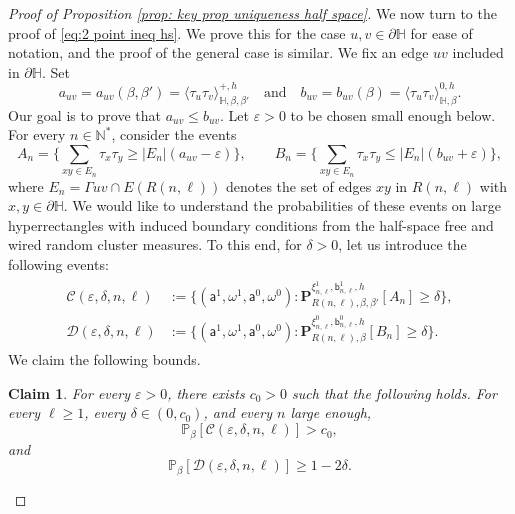 \documentclass[11pt,a4paper]{article}
\numberwithin{equation}{section}
\theoremstyle{plain}
\newtheorem{Claim}[Thm]{Claim}
\theoremstyle{definition}
\begin{document}
\begin{proof}[Proof of Proposition \textup{\ref{prop: key prop uniqueness half space}}]

We now turn to the proof of \eqref{eq:2 point ineq hs}. We prove this for the case $u,v\in \partial \mathbb{H}$ for ease of notation, and the proof of the general case is similar. We fix an edge $uv$ included in $\partial \mathbb H$. Set 
\begin{equation}
a_{uv}=a_{uv}(\beta,\beta')=\langle \tau_u \tau_v \rangle ^{+,h}_{\mathbb{H},\beta,\beta'}
\quad \text{and} \quad
b_{uv}=b_{uv}(\beta)=\langle \tau_u \tau_v \rangle ^{0,h}_{\mathbb{H},\beta}.
\end{equation}
Our goal is to prove that $a_{uv}\leq b_{uv}$. Let $\varepsilon>0$ to be chosen small enough below. For every $n \in \mathbb N^*$, consider the events
\begin{equation}\label{eq: def a_n b_n half space}
A_n=\Big\{\sum_{xy\in E_n}\tau_x \tau_y\ge |E_n|(a_{uv}-\varepsilon)\Big\}, \qquad B_n=\Big\{\sum_{xy\in E_n}\tau_x \tau_y\le |E_n| (b_{uv}+\varepsilon)\Big\},
\end{equation}
where $E_n=\Gamma uv \cap E(R(n,\ell))$ denotes the set of edges $xy$ in $R(n,\ell)$ with $x,y\in \partial \mathbb{H}$. We would like to understand the probabilities of these events on large hyperrectangles with induced boundary conditions from the half-space free and wired random cluster measures. To this end, for $\delta>0$, let us introduce the following events:
\begin{align}
\begin{aligned}
\mathcal C(\varepsilon,\delta,n,\ell)& := \Big\{ (\mathsf a^1, \omega^1, \mathsf a^0, \omega^0) : \mathbf P^{\xi^1_{n,\ell},\mathsf b^1_{n,\ell}, h}_{R(n,\ell), \beta,\beta'}[A_n] \geq \delta \Big\},
\\ 
\mathcal{D}(\varepsilon,\delta,n,\ell)&:=\Big\{(\mathsf a^1, \omega^1, \mathsf a^0, \omega^0): \mathbf P^{\xi^0_{n,\ell},\mathsf b^0_{n,\ell}, h}_{R(n,\ell), \beta}[B_n] \geq \delta\Big\}.
\end{aligned}
\end{align}
We claim the following bounds.
\begin{Claim}\label{claim:mathcalCD} For every $\varepsilon>0$, there exists $c_0>0$ such that the following holds. For every $\ell\geq 1$, every $\delta\in (0,c_0)$, and every $n$ large enough,
\begin{equation}
    \mathbb P_\beta[\mathcal C(\varepsilon,\delta,n,\ell)] > c_0,
\end{equation}
and
\begin{equation}
\mathbb P_\beta[\mathcal D(\varepsilon,\delta,n,\ell)]\geq 1-2\delta.  
\end{equation}
\end{Claim}


\end{proof}
\end{document}

